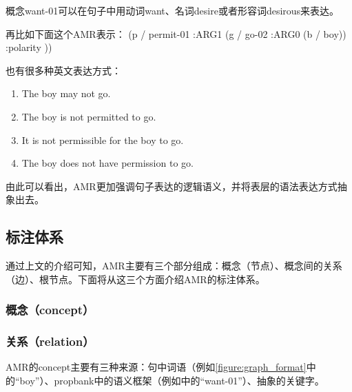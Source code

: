 \documentclass[master, winfont]{njuthesis}
\begin{document}
概念want-01可以在句子中用动词want、名词desire或者形容词desirous来表达。

再比如下面这个AMR表示：
(p / permit-01
     :ARG1 (g / go-02
              :ARG0 (b / boy))
     :polarity ))

也有很多种英文表达方式：
\begin{enumerate}
  \item The boy may not go.
  \item The boy is not permitted to go.
  \item It is not permissible for the boy to go.
  \item The boy does not have permission to go.
\end{enumerate}

由此可以看出，AMR更加强调句子表达的逻辑语义，并将表层的语法表达方式抽象出去。

\subsection{标注体系}
通过上文的介绍可知，AMR主要有三个部分组成：概念（节点）、概念间的关系（边）、根节点。下面将从这三个方面介绍AMR的标注体系。

\subsubsection{概念（concept）}

\subsubsection{关系（relation）}
AMR的concept主要有三种来源：句中词语（例如\ref{figure:graph_format}中的“boy”）、propbank中的语义框架（例如\label{figure:graph_format}中的“want-01”）、抽象的关键字。
\end{document}
